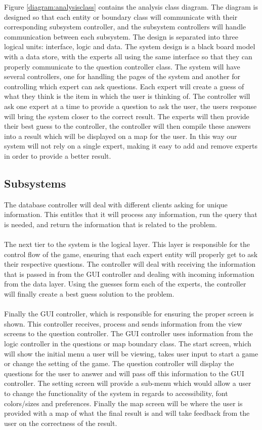 \documentclass[titlepage]{article}
\begin{document}
Figure \ref{diagram:analysisclass} contains the analysis class diagram. The diagram is designed so that each entity or boundary class will communicate with their corresponding subsystem controller, and the subsystem controllers will handle communication between each subsystem. The design is separated into three logical units: interface, logic and data. The system design is a black board model with a data store, with the experts all using the same interface so that they can properly communicate to the question controller class. The system will have several controllers, one for handling the pages of the system and another for controlling which expert can ask questions. Each expert will create a guess of what they think is the item in which the user is thinking of. The controller will ask one expert at a time to provide a question to ask the user, the users response will bring the system closer to the correct result. The experts will then provide their best guess to the controller, the controller will then compile these answers into a result which will be displayed on a map for the user. In this way our system will not rely on a single expert, making it easy to add and remove experts in order to provide a better result.

\subsection{Subsystems}
\label{sub:subsystems}

The database controller will deal with different clients asking for unique information. This entitles that it will process any information, run the query that is needed, and return the information that is related to the problem. 
\\ \\
The next tier to the system is the logical layer. This layer is responsible for the control flow of the game, ensuring that each expert entity will properly get to ask their respective questions. The controller will deal with receiving the information that is passed in from the GUI controller and dealing with incoming information from the data layer. Using the guesses form each of the experts, the controller will finally create a best guess solution to the problem.
\\ \\
Finally the GUI controller, which is responsible for ensuring the proper screen is shown. This controller receives, process and sends information from the view screens to the question controller. The GUI controller uses information from the logic controller in the questions or map boundary class. The start screen, which will show the initial menu a user will be viewing,  takes user input to start a game or change the setting of the game. The question controller will display the questions for the user to answer and will pass off this information to the GUI controller. The setting screen will provide a sub-menu which would allow a user to change the functionality of the system in regards to accessibility, font colors/sizes and preferences. Finally the map screen will be where the user is provided with a map of what the final result is and will take feedback from the user on the correctness of the result.
\end{document}
